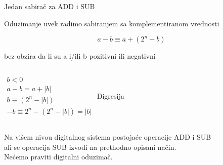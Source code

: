 
\begin{frame}[label=05-s025]{Jedan sabirač za ADD i SUB}
\fontsize{10}{12}\selectfont
\begin{center}\alert{Oduzimanje uvek radimo sabiranjem sa komplementiranom vrednosti}\end{center}
\[a-b\equiv a+(2^n-b)\]
\begin{center}\alert{bez obzira da li su a i/ili b pozitivni ili negativni}\end{center}
\begin{columns}[c,onlytextwidth]
\centering
$\begin{gathered}b<0\\a-b=a+|b|\\b\equiv(2^n-|b|)\\-b\equiv2^n-(2^n-|b|)=|b|\end{gathered}$
Digresija
\end{columns}\par\vspace{6mm}
Na višem nivou digitalnog sistema postojaće operacije ADD i SUB\\
ali se operacija SUB izvodi na prethodno opisani način.\\
Nećemo praviti digitalni oduzimač.
\end{frame}
